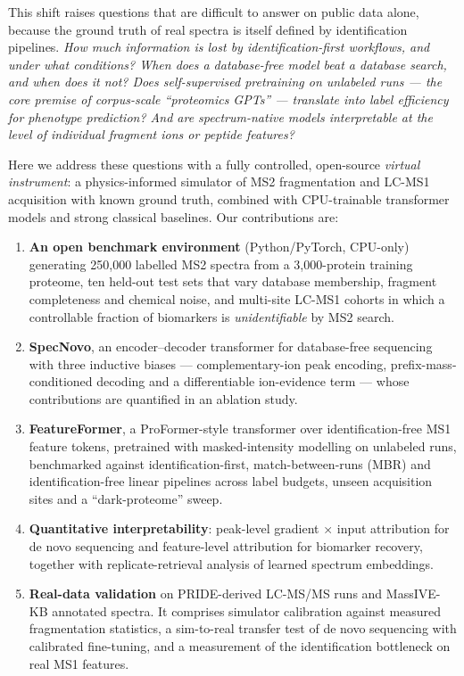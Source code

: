 \documentclass[pdflatex,sn-mathphys-num]{sn-jnl}
\begin{document}
This shift raises questions that are difficult to answer on public data alone, because the ground truth of real spectra is itself defined by identification pipelines. \emph{How much information is lost by identification-first workflows, and under what conditions? When does a database-free model beat a database search, and when does it not? Does self-supervised pretraining on unlabeled runs --- the core premise of corpus-scale ``proteomics GPTs'' --- translate into label efficiency for phenotype prediction? And are spectrum-native models interpretable at the level of individual fragment ions or peptide features?}

Here we address these questions with a fully controlled, open-source \emph{virtual instrument}: a physics-informed simulator of MS2 fragmentation and LC-MS1 acquisition with known ground truth, combined with CPU-trainable transformer models and strong classical baselines. Our contributions are:

\begin{enumerate}
\def\labelenumi{\arabic{enumi}.}
\item
  \textbf{An open benchmark environment} (Python/PyTorch, CPU-only) generating 250,000 labelled MS2 spectra from a 3,000-protein training proteome, ten held-out test sets that vary database membership, fragment completeness and chemical noise, and multi-site LC-MS1 cohorts in which a controllable fraction of biomarkers is \emph{unidentifiable} by MS2 search.
\item
  \textbf{SpecNovo}, an encoder--decoder transformer for database-free sequencing with three inductive biases --- complementary-ion peak encoding, prefix-mass-conditioned decoding and a differentiable ion-evidence term --- whose contributions are quantified in an ablation study.
\item
  \textbf{FeatureFormer}, a ProFormer-style transformer over identification-free MS1 feature tokens, pretrained with masked-intensity modelling on unlabeled runs, benchmarked against identification-first, match-between-runs (MBR) and identification-free linear pipelines across label budgets, unseen acquisition sites and a ``dark-proteome'' sweep.
\item
  \textbf{Quantitative interpretability}: peak-level gradient × input attribution for de novo sequencing and feature-level attribution for biomarker recovery, together with replicate-retrieval analysis of learned spectrum embeddings.
\item
  \textbf{Real-data validation} on PRIDE-derived LC-MS/MS runs and MassIVE-KB annotated spectra. It comprises simulator calibration against measured fragmentation statistics, a sim-to-real transfer test of de novo sequencing with calibrated fine-tuning, and a measurement of the identification bottleneck on real MS1 features.
\end{enumerate}
\end{document}
